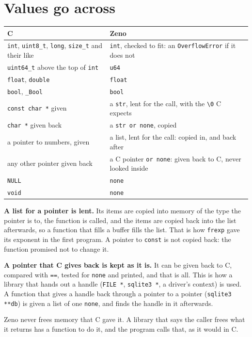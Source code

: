 \section{Values go across}

\begin{center}
\begin{tabular}{P{5.2cm}P{7.2cm}}
\toprule
C & Zeno \\
\midrule
\verb|int|, \verb|uint8_t|, \verb|long|, \verb|size_t| and their like &
  \verb|int|, checked to fit: an \verb|OverflowError| if it does not \\
\verb|uint64_t| above the top of \verb|int| & \verb|u64| \\
\verb|float|, \verb|double| & \verb|float| \\
\verb|bool|, \verb|_Bool| & \verb|bool| \\
\verb|const char *| given & a \verb|str|, lent for the call, with the
  \verb|\0| C expects \\
\verb|char *| given back & a \verb|str or none|, copied \\
a pointer to numbers, given & a list, lent for the call: copied in,
  and back after \\
any other pointer given back & a C pointer \verb|or none|: given back
  to C, never looked inside \\
\verb|NULL| & \verb|none| \\
\verb|void| & \verb|none| \\
\bottomrule
\end{tabular}
\end{center}

\textbf{A list for a pointer is lent.} Its items are copied into
memory of the type the pointer is to, the function is called, and the
items are copied back into the list afterwards, so a function that
fills a buffer fills the list. That is how \verb|frexp| gave its
exponent in the first program. A pointer to \verb|const| is not copied
back: the function promised not to change it.

\textbf{A pointer that C gives back is kept as it is.} It can be given
back to C, compared with \verb|==|, tested for \verb|none| and printed,
and that is all. This is how a library that hands out a handle
(\verb|FILE *|, \verb|sqlite3 *|, a driver's context) is used. A
function that gives a handle back through a pointer to a pointer
(\verb|sqlite3 **db|) is given a list of one \verb|none|, and finds
the handle in it afterwards.

Zeno never frees memory that C gave it. A library that says the caller
frees what it returns has a function to do it, and the program calls
that, as it would in C.

